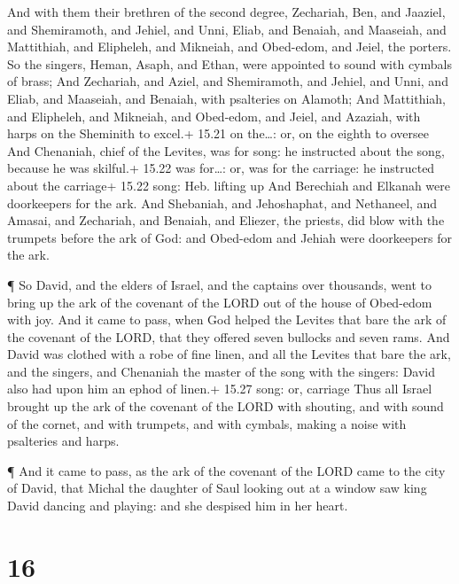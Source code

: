  And with them their brethren of the second degree,
Zechariah, Ben, and Jaaziel, and Shemiramoth, and Jehiel, and Unni,
Eliab, and Benaiah, and Maaseiah, and Mattithiah, and Elipheleh, and
Mikneiah, and Obed-edom, and Jeiel, the porters.  So the
singers, Heman, Asaph, and Ethan, were appointed to sound with cymbals
of brass;  And Zechariah, and Aziel, and Shemiramoth, and
Jehiel, and Unni, and Eliab, and Maaseiah, and Benaiah, with psalteries
on Alamoth;  And Mattithiah, and Elipheleh, and Mikneiah,
and Obed-edom, and Jeiel, and Azaziah, with harps on the Sheminith to
excel.+ 15.21 on the\ldots: or, on the eighth to oversee 
And Chenaniah, chief of the Levites, was for song: he instructed about
the song, because he was skilful.+ 15.22 was for\ldots: or, was for the
carriage: he instructed about the carriage+ 15.22 song: Heb. lifting up
 And Berechiah and Elkanah were doorkeepers for the ark.
 And Shebaniah, and Jehoshaphat, and Nethaneel, and Amasai,
and Zechariah, and Benaiah, and Eliezer, the priests, did blow with the
trumpets before the ark of God: and Obed-edom and Jehiah were
doorkeepers for the ark.

 ¶ So David, and the elders of Israel, and the captains
over thousands, went to bring up the ark of the covenant of the LORD out
of the house of Obed-edom with joy.  And it came to pass,
when God helped the Levites that bare the ark of the covenant of the
LORD, that they offered seven bullocks and seven rams.  And
David was clothed with a robe of fine linen, and all the Levites that
bare the ark, and the singers, and Chenaniah the master of the song with
the singers: David also had upon him an ephod of linen.+ 15.27 song: or,
carriage  Thus all Israel brought up the ark of the
covenant of the LORD with shouting, and with sound of the cornet, and
with trumpets, and with cymbals, making a noise with psalteries and
harps.

 ¶ And it came to pass, as the ark of the covenant of the
LORD came to the city of David, that Michal the daughter of Saul looking
out at a window saw king David dancing and playing: and she despised him
in her heart.

\hypertarget{section-15}{%
\section{16}\label{section-15}}


